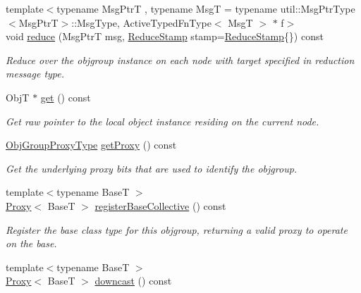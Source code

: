 \begin{DoxyCompactItemize}
{\footnotesize template$<$typename Msg\+PtrT , typename MsgT  = typename util\+::\+Msg\+Ptr\+Type$<$\+Msg\+Ptr\+T$>$\+::\+Msg\+Type, Active\+Typed\+Fn\+Type$<$ Msg\+T $>$ $\ast$ f$>$ }\\void \hyperlink{structvt_1_1objgroup_1_1proxy_1_1_proxy_a491518842d05bb84d4b190765a02530f}{reduce} (Msg\+PtrT msg, \hyperlink{structvt_1_1objgroup_1_1proxy_1_1_proxy_a337be4c20cf11ff6477c7a66208cc909}{Reduce\+Stamp} stamp=\hyperlink{structvt_1_1objgroup_1_1proxy_1_1_proxy_a337be4c20cf11ff6477c7a66208cc909}{Reduce\+Stamp}\{\}) const
\begin{DoxyCompactList}\small\item\em Reduce over the objgroup instance on each node with target specified in reduction message type. \end{DoxyCompactList}\item 
ObjT $\ast$ \hyperlink{structvt_1_1objgroup_1_1proxy_1_1_proxy_a62eef779c097c8398e249827e4ad7c6a}{get} () const
\begin{DoxyCompactList}\small\item\em Get raw pointer to the local object instance residing on the current node. \end{DoxyCompactList}\item 
\hyperlink{namespacevt_ad7cae989df485fccca57f0792a880a8e}{Obj\+Group\+Proxy\+Type} \hyperlink{structvt_1_1objgroup_1_1proxy_1_1_proxy_a76cda2351cf7801abe2ebffa1403c5b8}{get\+Proxy} () const
\begin{DoxyCompactList}\small\item\em Get the underlying proxy bits that are used to identify the objgroup. \end{DoxyCompactList}\item 
{\footnotesize template$<$typename BaseT $>$ }\\\hyperlink{structvt_1_1objgroup_1_1proxy_1_1_proxy}{Proxy}$<$ BaseT $>$ \hyperlink{structvt_1_1objgroup_1_1proxy_1_1_proxy_a3504fe25af8c839995a98d445af37282}{register\+Base\+Collective} () const
\begin{DoxyCompactList}\small\item\em Register the base class type for this objgroup, returning a valid proxy to operate on the base. \end{DoxyCompactList}\item 
{\footnotesize template$<$typename BaseT $>$ }\\\hyperlink{structvt_1_1objgroup_1_1proxy_1_1_proxy}{Proxy}$<$ BaseT $>$ \hyperlink{structvt_1_1objgroup_1_1proxy_1_1_proxy_ae672794dc83491200d7f6e794865a6bc}{downcast} () const

\end{DoxyCompactItemize}
